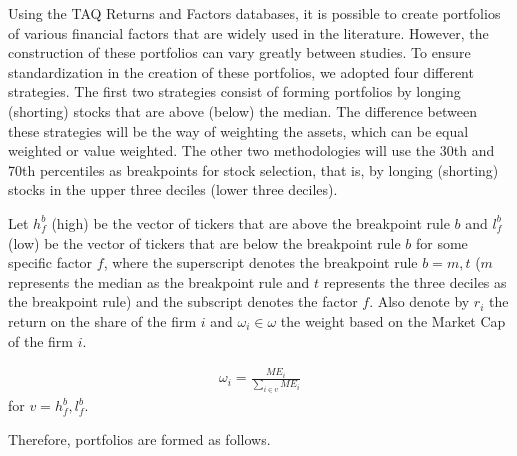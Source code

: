 Using the TAQ Returns and Factors databases, it is possible to create portfolios of various financial factors that are widely used in the literature. However, the construction of these portfolios can vary greatly between studies. To ensure standardization in the creation of these portfolios, we adopted four different strategies. The first two strategies consist of forming portfolios by longing (shorting) stocks that are above (below) the median. The difference between these strategies will be the way of weighting the assets, which can be equal weighted or value weighted. The other two methodologies will use the 30th and 70th percentiles as breakpoints for stock selection, that is, by longing (shorting) stocks in the upper three deciles (lower three deciles).

Let $h_{f}^{b}$ (high) be the vector of tickers that are above the breakpoint rule $b$ and $l_{f}^{b}$ (low) be the vector of tickers that are below the breakpoint rule $b$ for some specific factor $f$, where the superscript denotes the breakpoint rule $b = m, t$ ($m$ represents the median as the breakpoint rule and $t$ represents the three deciles as the breakpoint rule) and the subscript denotes the factor $f$. Also denote by $r_i$ the return on the share of the firm $i$ and $\omega_i \in \omega$ the weight based on the Market Cap of the firm $i$.


\begin{align*}
	\omega_i = \frac{ME_i}{\sum_{i \in v} ME_i}
\end{align*}
for $v = h_{f}^{b}, l_{f}^{b}$.


Therefore, portfolios are formed as follows.


